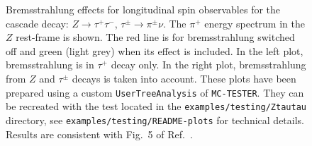 \documentclass[]{Photos_interface_design}
\begin{document}
\begin{figure}[h!]
\centering
{}
\caption{ Bremsstrahlung effects for longitudinal spin observables
for the cascade decay: $Z \to \tau^+ \tau^-$, $\tau^\pm \to \pi^\pm\nu$.
The $\pi^+$ energy spectrum in the $Z$ rest-frame  is shown. The red line is for 
bremsstrahlung switched off
and green (light grey) when its effect is included. 
In the left plot, bremsstrahlung is in $\tau^+ $ decay only.
In the right plot, bremsstrahlung from $Z$ and  $\tau^\pm$ decays is
taken into account.
These plots have been prepared using a custom {\tt UserTreeAnalysis} of {\tt MC-TESTER}.
They  can be recreated with the test located in the {\tt examples/testing/Ztautau} directory, see  {\tt examples/testing/README-plots} for technical details. Results are 
consistent with Fig.~5 of Ref.~\cite{Eberhard:1989ve}.
\label{fig:KKMC}
}
\end{figure}
\end{document}
